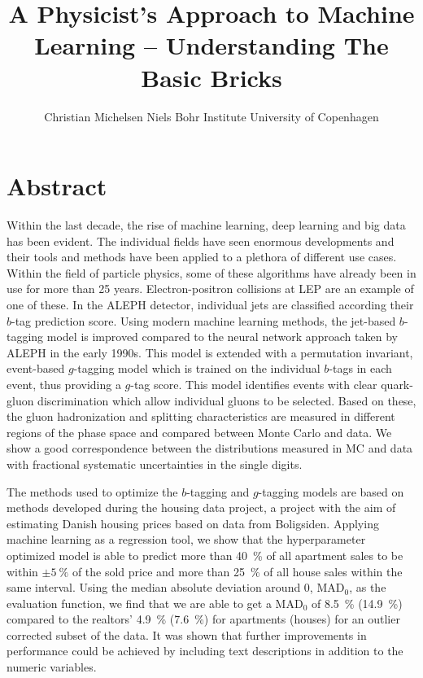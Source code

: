 \documentclass[a4paper, twoside, nobib, justified]{tufte-book} %
\title[A Physicist's Approach To Machine Learning -- Understanding The Basic Bricks]{A Physicist's \newline \noindent 
       Approach to \newline \noindent 
       Machine Learning \newline \noindent
       --  \newline \noindent
       Understanding  \newline \noindent
       The Basic Bricks}
\author[Christian Michelsen]{\newline \noindent 
        Christian Michelsen \newline \noindent 
        Niels Bohr Institute \newline \noindent 
        University of Copenhagen \newline }
\begin{document}
\begin{titlepage}
  
\end{titlepage}



\chapter*{Abstract}
Within the last decade, the rise of machine learning, deep learning and big data has been evident. The individual fields have seen enormous developments and their tools and methods have been applied to a plethora of different use cases. Within the field of particle physics, some of these algorithms have already been in use for more than 25 years. Electron-positron collisions at LEP are an example of one of these. In the ALEPH detector, individual jets are classified according their $b$-tag prediction score. Using modern machine learning methods, the jet-based $b$-tagging model is improved compared to the neural network approach taken by ALEPH in the early 1990s. This model is extended with a permutation invariant, event-based $g$-tagging model which is trained on the individual $b$-tags in each event, thus providing a $g$-tag score. This model identifies events with clear quark-gluon discrimination which allow individual gluons to be selected. Based on these, the gluon hadronization and splitting characteristics are measured in different regions of the phase space and compared between Monte Carlo and data. We show a good correspondence between the distributions measured in MC and data with fractional systematic uncertainties in the single digits. 

The methods used to optimize the $b$-tagging and $g$-tagging models are based on methods developed during the housing data project, a project with the aim of estimating Danish housing prices based on data from Boligsiden. Applying machine learning as a regression tool, we show that the hyperparameter optimized model is able to predict more than \SI{40}{\percent} of all apartment sales to be within $\pm\SI{5}{\percent}$ of the sold price and more than \SI{25}{\percent} of all house sales within the same interval. Using the median absolute deviation around \num{0}, $\mathrm{MAD}_0$, as the evaluation function, we find that we are able to get a $\mathrm{MAD}_0$ of \SI{8.5}{\percent} (\SI{14.9}{\percent}) compared to the realtors' \SI{4.9}{\percent} (\SI{7.6}{\percent}) for apartments (houses) for an outlier corrected subset of the data. It was shown that further improvements in performance could be achieved by including text descriptions in addition to the numeric variables.
\end{document}
